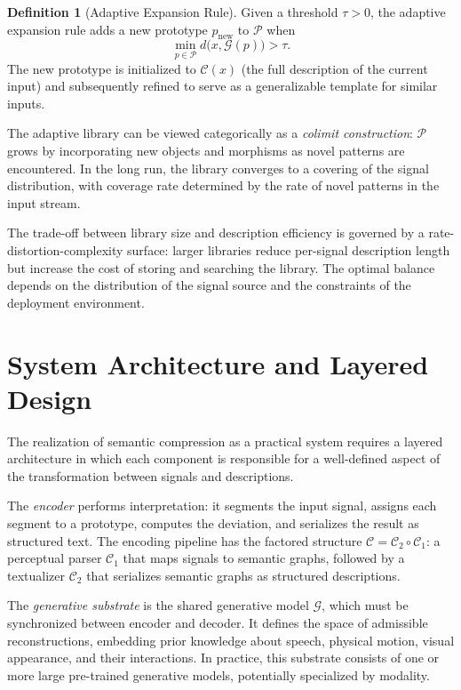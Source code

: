 \documentclass[12pt,a4paper]{article}
\theoremstyle{definition}
\newtheorem{definition}[theorem]{Definition}
\theoremstyle{remark}
\begin{document}
\begin{definition}[Adaptive Expansion Rule]
Given a threshold $\tau > 0$, the adaptive expansion rule adds a new prototype $p_{\mathrm{new}}$ to $\mathcal{P}$ when
\[
\min_{p \in \mathcal{P}} d\big(x, \mathcal{G}(p)\big) > \tau.
\]
The new prototype is initialized to $\mathcal{C}(x)$ (the full description of the current input) and subsequently refined to serve as a generalizable template for similar inputs.
\end{definition}

The adaptive library can be viewed categorically as a \emph{colimit construction}: $\mathcal{P}$ grows by incorporating new objects and morphisms as novel patterns are encountered. In the long run, the library converges to a covering of the signal distribution, with coverage rate determined by the rate of novel patterns in the input stream.

The trade-off between library size and description efficiency is governed by a rate-distortion-complexity surface: larger libraries reduce per-signal description length but increase the cost of storing and searching the library. The optimal balance depends on the distribution of the signal source and the constraints of the deployment environment.

\section{System Architecture and Layered Design}
\label{sec:architecture}

The realization of semantic compression as a practical system requires a layered architecture in which each component is responsible for a well-defined aspect of the transformation between signals and descriptions.

The \emph{encoder} performs interpretation: it segments the input signal, assigns each segment to a prototype, computes the deviation, and serializes the result as structured text. The encoding pipeline has the factored structure $\mathcal{C} = \mathcal{C}_2 \circ \mathcal{C}_1$: a perceptual parser $\mathcal{C}_1$ that maps signals to semantic graphs, followed by a textualizer $\mathcal{C}_2$ that serializes semantic graphs as structured descriptions.

The \emph{generative substrate} is the shared generative model $\mathcal{G}$, which must be synchronized between encoder and decoder. It defines the space of admissible reconstructions, embedding prior knowledge about speech, physical motion, visual appearance, and their interactions. In practice, this substrate consists of one or more large pre-trained generative models, potentially specialized by modality.
\end{document}
